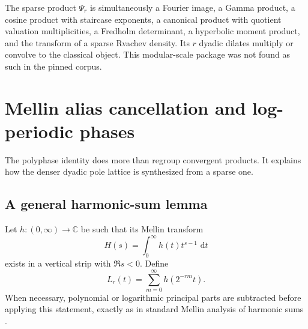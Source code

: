 \documentclass[11pt,oneside]{article}
\theoremstyle{definition}
\newcommand{\dd}{\,\mathrm d}
\newcommand{\C}{\mathbb C}
\begin{document}
\begin{resultbox}
The sparse product $\Psi_r$ is simultaneously a Fourier image, a Gamma product,
a cosine product with staircase exponents, a canonical product with quotient
valuation multiplicities, a Fredholm determinant, a hyperbolic moment product,
and the transform of a sparse Rvachev density.  Its $r$ dyadic dilates multiply
or convolve to the classical object.  This modular-scale package was not found
as such in the pinned corpus.
\end{resultbox}

\section{Mellin alias cancellation and log-periodic phases}
\label{p2:sec:mellin-polyphase}

The polyphase identity does more than regroup convergent products.  It explains
how the denser dyadic pole lattice is synthesized from a sparse one.

\subsection{A general harmonic-sum lemma}

Let $h:(0,\infty)\to\C$ be such that its Mellin transform
\begin{equation}
 H(s)=\int_0^{\infty}h(t)t^{s-1}\,\dd t                     \label{p2:eq:H-Mellin}
\end{equation}
exists in a vertical strip with $\Re s<0$.  Define
\begin{equation}
 L_r(t)=\sum_{m=0}^{\infty}h(2^{-rm}t).                     \label{p2:eq:Lr-harmonic}
\end{equation}
When necessary, polynomial or logarithmic principal parts are subtracted before
applying this statement, exactly as in standard Mellin analysis of harmonic
sums \cite{p2:flajolet1995}.
\end{document}
